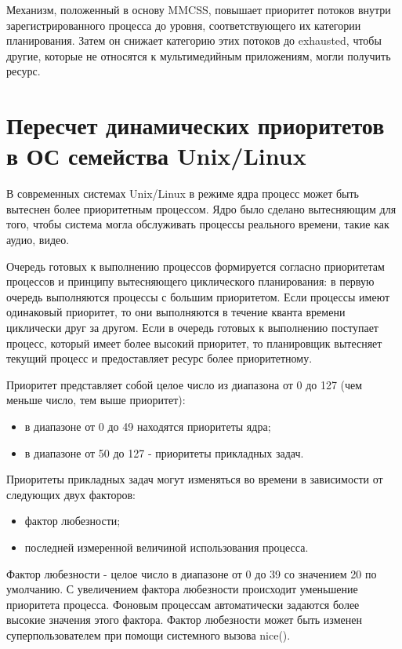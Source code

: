 Механизм, положенный в основу MMCSS, повышает приоритет потоков внутри зарегистрированного процесса до уровня, соответствующего их категории планирования. Затем он снижает категорию этих потоков до exhausted, чтобы другие, которые не относятся к мультимедийным приложениям, могли получить ресурс.

\section{Пересчет динамических приоритетов в ОС семейства Unix/Linux}
В современных системах Unix/Linux в режиме ядра процесс может быть вытеснен более приоритетным процессом. Ядро было сделано вытесняющим для того, чтобы система могла обслуживать процессы реального времени, такие как аудио, видео.

Очередь готовых к выполнению процессов формируется согласно приоритетам процессов и принципу вытесняющего циклического планирования: в первую очередь выполняются процессы с большим приоритетом. Если процессы имеют одинаковый приоритет, то они выполняются в течение кванта времени циклически друг за другом. Если в очередь готовых к выполнению поступает процесс, который имеет более высокий приоритет, то планировщик вытесняет текущий процесс и предоставляет ресурс более приоритетному.

Приоритет представляет собой целое число из диапазона от 0 до 127 (чем меньше число, тем выше приоритет):
\begin{itemize}
	\item в диапазоне от 0 до 49 находятся приоритеты ядра;
	\item в диапазоне от 50 до 127 - приоритеты прикладных задач.
\end{itemize}

Приоритеты прикладных задач могут изменяться во времени в зависимости от следующих двух факторов:
\begin{itemize}
	\item фактор любезности;
	\item последней измеренной величиной использования процесса.
\end{itemize}

Фактор любезности - целое число в диапазоне от 0 до 39 со значением 20 по умолчанию. С увеличением фактора любезности происходит уменьшение приоритета процесса. Фоновым процессам автоматически задаются более высокие значения этого фактора. Фактор любезности может быть изменен суперпользователем при помощи системного вызова nice().


